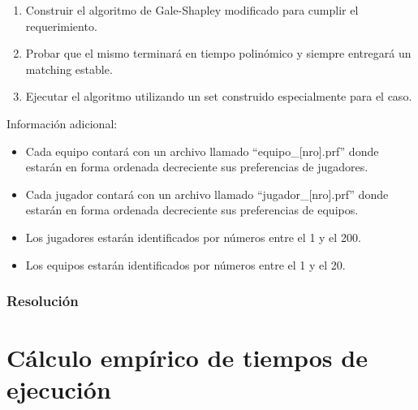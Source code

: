 \documentclass{article}
\begin{document}
\begin{enumerate}
    \item Construir el algoritmo de Gale-Shapley modificado para cumplir el requerimiento.

    \item Probar que el mismo terminará en tiempo polinómico y siempre entregará un matching estable.

    \item Ejecutar el algoritmo utilizando un set construido especialmente para el caso.
\end{enumerate}

Información adicional:
\begin{itemize}
    \item Cada equipo contará con un archivo llamado “equipo\_[nro].prf” donde estarán en forma ordenada decreciente sus preferencias de jugadores.

    \item Cada jugador contará con un archivo llamado “jugador\_[nro].prf” donde estarán en forma ordenada decreciente sus preferencias de equipos.

    \item Los jugadores estarán identificados por números entre el 1 y el 200.

    \item Los equipos estarán identificados por números entre el 1 y el 20.
\end{itemize}

\newpage
\section{Resolución}
\part{Cálculo empírico de tiempos de ejecución}
\end{document}
